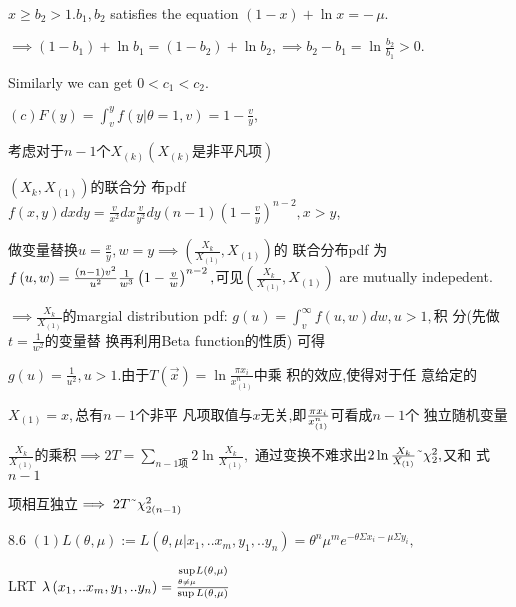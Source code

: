 \documentclass{ctexart}
\begin{document}
$x\geq b_{2}>1.b_{1},b_{2}$ satisfies the equation $\left( 1-x\right) +\ln
x=-\,\mu .$

$\implies \left( 1-b_{1}\right) +\ln b_{1}=\left( 1-b_{2}\right) +\ln
b_{2},\implies b_{2}-b_{1}=\ln \frac{b_{2}}{b_{1}}>0.$

Similarly we can get $0<c_{1}<c_{2}.$

$\left( c\right) F\left( y\right) =\int_{v}^{y}f\left( y|\theta =1,v\right)
=1-\frac{v}{y},$

考虑对于$n-1$个$X_{\left( k\right) }\left(
X_{\left( k\right) }\text{是非平凡项}\right) $

$\left( X_{k},X_{\left( 1\right) }\right) $的联合分%
布pdf $f\left( x,y\right) dxdy=\frac{v}{x^{2}}dx\frac{v}{y^{2}}%
dy\left( n-1\right) \left( 1-\frac{v}{y}\right) ^{n-2},x>y$,

做变量替换$u=\frac{x}{y},w=y\implies \left( 
\frac{X_{k}}{X_{\left( 1\right) }},X_{\left( 1\right) }\right) $的%
联合分布pdf 为$f\left( u,w\right) =\frac{%
\left( n-1\right) v^{2}}{u^{2}}\frac{1}{w^{3}}\left( 1-\frac{v}{w}\right)
^{n-2},$可见$\left( \frac{X_{k}}{X_{\left( 1\right) }},X_{\left(
1\right) }\right) $ are mutually indepedent.

$\implies \frac{X_{k}}{X_{\left( 1\right) }}$的margial distribution
pdf: $g\left( u\right) =\int_{v}^{\infty }f\left( u,w\right) dw,u>1,$积%
分(先做$t=\frac{1}{w^{2}}$的变量替%
换再利用Beta function的性质)%
可得

$g\left( u\right) =\frac{1}{u^{2}},u>1.$由于$T\left( \vec{x}%
\right) =\ln \frac{\pi x_{i}}{x_{\left( 1\right) }^{n}}$中乘%
积的效应,使得对于任%
意给定的

$X_{\left( 1\right) }=x,$总有$n-1$个非平%
凡项取值与$x$无关,即$\frac{%
\pi x_{i}}{x_{\left( 1\right) }^{n}}$可看成$n-1$个%
独立随机变量

$\frac{X_{k}}{X_{\left( 1\right) }}$的乘积$\implies 2T=%
\underset{n-1项 }{\sum }2\ln \frac{X_{k}}{X_{\left( 1\right) }},$%
通过变换不难求出$2\ln \frac{%
X_{k}}{X_{\left( 1\right) }}\symbol{126}\chi _{2}^{2},$又和%
式$n-1$

项相互独立$\implies 2T\symbol{126}\chi
_{2\left( n-1\right) }^{2}$

8.6 $\left( 1\right) L\left( \theta ,\mu \right) :=L\left( \theta ,\mu
|x_{1},..x_{m},y_{1},..y_{n}\right) =\theta ^{n}\mu ^{m}e^{-\theta \Sigma
x_{i}-\mu \Sigma y_{i}},$

\bigskip LRT $\lambda \left( x_{1},..x_{m},y_{1},..y_{n}\right) =\frac{%
\underset{\theta \neq \mu }{\sup }L\left( \theta ,\mu \right) }{\sup L\left(
\theta ,\mu \right) }$
\end{document}
